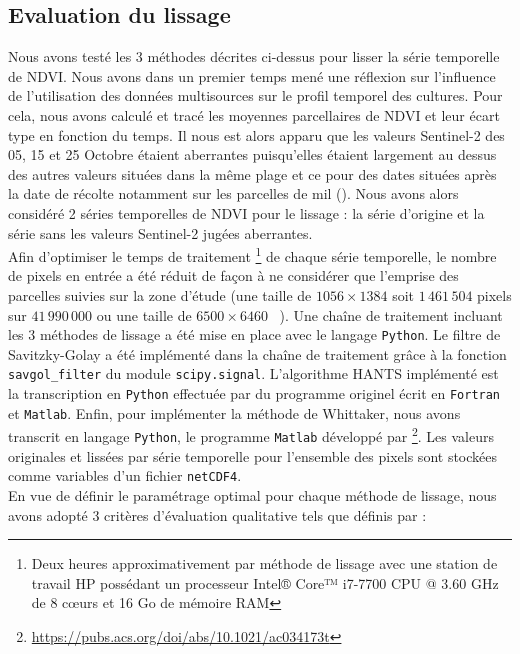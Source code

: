 \subsection{Evaluation du lissage}

Nous avons testé les 3 méthodes décrites ci-dessus pour lisser la série temporelle de NDVI. Nous avons dans un premier temps mené une réflexion sur l'influence de l'utilisation des données multisources sur le profil temporel des cultures. Pour cela, nous avons calculé et tracé les moyennes parcellaires de NDVI et leur écart type en fonction du temps. Il nous est alors apparu que les valeurs Sentinel-2 des 05, 15 et 25 Octobre étaient aberrantes puisqu'elles étaient largement au dessus des autres valeurs situées dans la même plage et ce pour des dates situées après la date de récolte notamment sur les parcelles de mil (). Nous avons alors considéré 2 séries temporelles de NDVI pour le lissage : la série d'origine et la série sans les valeurs Sentinel-2 jugées aberrantes. 
\\Afin d'optimiser le temps de traitement \footnote{Deux heures approximativement par méthode de lissage avec une station de travail HP possédant un processeur Intel® Core™ i7-7700 CPU @ 3.60 GHz de 8 c\oe urs et 16 Go de mémoire RAM} de chaque série temporelle, le nombre de pixels en entrée a été réduit de façon à ne considérer que l'emprise des parcelles suivies sur la zone d'étude (une taille de $1056\times1384$ soit $1\,461\,504$ pixels sur $41\,990\,000$ ou une taille de $6500\times6460$ ~). Une chaîne de traitement incluant les 3 méthodes de lissage a été mise en place avec le langage \texttt{Python}. Le filtre de Savitzky-Golay a été implémenté dans la chaîne de traitement grâce à la fonction \texttt{savgol\_filter} du module \texttt{scipy.signal}. L'algorithme HANTS implémenté est la transcription en \texttt{Python} effectuée par \citet{Espinoza-Davalos2017} du programme originel écrit en \texttt{Fortran} et \texttt{Matlab}. Enfin, pour implémenter la méthode de Whittaker, nous avons transcrit en langage \texttt{Python}, le programme \texttt{Matlab} développé par \citet{Eilers2003} \footnote{\url{https://pubs.acs.org/doi/abs/10.1021/ac034173t}}. Les valeurs originales et lissées par série temporelle pour l'ensemble des pixels sont stockées comme variables d'un fichier \texttt{netCDF4}. 
\\En vue de définir le paramétrage optimal pour chaque méthode de lissage, nous avons adopté 3 critères d'évaluation qualitative tels que définis par \citet{Klisch2006} : 
